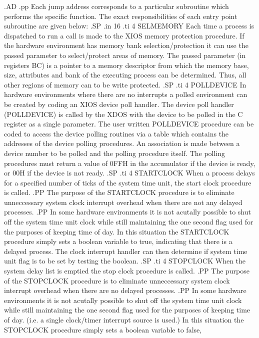 .AD
.pp
Each jump address corresponds to a particular subroutine which performs
the specific function.  The exact responsibilities
of each entry point subroutine are given below:
.SP
.in 16
.ti 4
SELMEMORY   Each time a process is dispatched to run a call is made to
the XIOS memory protection procedure.  If the hardware environment has
memory bank selection/protection it can use the passed
parameter to select/protect
areas of memory.  The passed parameter (in registers BC) is a pointer
to a memory descriptor from which the memory base, size,
attributes and bank
of the executing process can be determined.
Thus, all other regions of memory can to be write protected.
.SP
.ti 4
POLLDEVICE  In hardware environments where there are no interrupts a
polled environment can be created by coding an XIOS device poll handler.
The device poll handler (POLLDEVICE) is called by the XDOS with the
device to be polled in the C register as a single parameter.
The user written POLLDEVICE procedure can be coded to access the device
polling routines via a table which contains the addresses
of the device polling procedures.  An association is made between
a device number to be polled and the polling procedure itself.
The polling procedures must return a value of 0FFH in the accumulator
if the device is ready, or 00H if the device is not ready.
.SP
.ti 4
STARTCLOCK  When a process delays for a specified number of ticks of
the system time unit, the start clock procedure is called.
.PP
The purpose of the STARTCLOCK procedure is to eliminate unneccessary
system clock interrupt overhead when there are not any delayed
processes.
.PP
In some hardware environments it is not acutally possible to shut off
the system time unit clock while still maintaining the one second flag
used for the purposes of keeping time of day.  In this situation
the STARTCLOCK procedure simply sets a boolean variable to true,
indicating that there is a delayed process.  The clock interrupt
handler can then determine if system time unit flag is to be set
by testing the boolean.
.SP
.ti 4
STOPCLOCK   When the system delay list is emptied the stop clock
procedure is called.
.PP
The purpose of the STOPCLOCK procedure is to eliminate unneccessary
system clock interrupt overhead when there are no delayed
processes.
.PP
In some hardware environments it is not acutally possible to shut off
the system time unit clock while still maintaining the one second flag
used for the purposes of keeping time of day.  (i.e. a single
clock/timer interrupt source is used.)  In this situation
the STOPCLOCK procedure simply sets a boolean variable to false,
